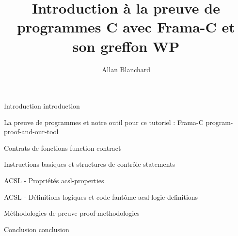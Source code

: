 \documentclass[middle]{zmdocument}
\title{Introduction à la preuve de programmes C avec Frama-C et son greffon WP}
\author{Allan Blanchard}
\begin{document}
\maketitle
\tableofcontents

\begin{levelOne}
  {Introduction}
  {introduction}
\end{levelOne}

\begin{levelOne}
  {La preuve de programmes et notre outil pour ce tutoriel : Frama-C}
  {program-proof-and-our-tool}
\end{levelOne}

\begin{levelOne}
  {Contrats de fonctions}
  {function-contract}
\end{levelOne}

\begin{levelOne}
  {Instructions basiques et structures de contrôle}
  {statements}
\end{levelOne}

\begin{levelOne}
  {ACSL - Propriétés}
  {acsl-properties}
\end{levelOne}

\begin{levelOne}
  {ACSL - Définitions logiques et code fantôme}
  {acsl-logic-definitions}
\end{levelOne}

\begin{levelOne}
  {Méthodologies de preuve}
  {proof-methodologies}
\end{levelOne}

\begin{levelOne}
  {Conclusion}
  {conclusion}
\end{levelOne}
\end{document}
